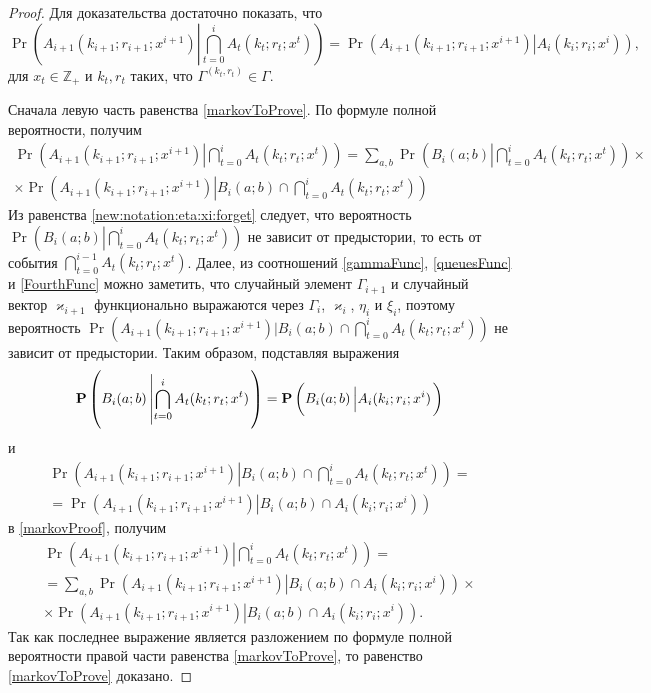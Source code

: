\documentclass[a4paper,12pt,russian]{extarticle}
\begin{document}
\begin{proof}
Для доказательства достаточно показать, что 
\begin{equation}
\Pr \left( A_{i+1}(k_{i+1};r_{i+1};x^{i+1}) \left|\bigcap_{t=0}^{i} A_t(k_t;r_t;x^{t})\right.\right) = \Pr \left( A_{i+1}(k_{i+1};r_{i+1};x^{i+1}) \left|A_i(k_i;r_i;x^{i})\right.\right),
\label{markovToProve}
\end{equation}
для $x_t \in {\mathbb Z}_+$ и $k_t,r_t$ таких, что $\Gamma^{(k_t,r_t)}\in \Gamma$.

Сначала левую часть равенства \eqref{markovToProve}. По формуле полной вероятности, получим
\begin{multline}
\Pr \left( A_{i+1}(k_{i+1};r_{i+1};x^{i+1}) \left|\bigcap_{t=0}^{i} A_t(k_t;r_t;x^{t})\right.\right) 
= \sum_{a,b}\Pr \left( B_i(a;b) \left|\bigcap_{t=0}^{i} A_t(k_t;r_t;x^{t})\right.\right)\times\\
\times \Pr \left( A_{i+1}(k_{i+1};r_{i+1};x^{i+1}) \left|B_i(a;b) \cap \bigcap_{t=0}^{i} A_t(k_t;r_t;x^{t})\right.\right)
\label{markovProof}
\end{multline}
Из равенства \eqref{new:notation:eta:xi:forget} следует, что вероятность  $\Pr \left( B_i(a;b) \left|\bigcap_{t=0}^{i} A_t(k_t;r_t;x^{t})\right.\right)$ не зависит от предыстории, то есть от события $\bigcap_{t=0}^{i-1} A_t(k_t;r_t;x^{t})$. 
Далее, из соотношений \eqref{gammaFunc}, \eqref{queuesFunc} и \eqref{FourthFunc} можно заметить, что случайный элемент $\Gamma_{i+1}$ и случайный вектор $\varkappa_{i+1}$ функционально выражаются через $\Gamma_i$, $\varkappa_i$, $\eta_i$ и $\xi_i$, поэтому вероятность $\Pr ( A_{i+1}(k_{i+1};r_{i+1};x^{i+1}) |B_i(a;b) \cap \bigcap_{t=0}^{i} A_t(k_t;r_t;x^{t}))$ не зависит от предыстории. Таким образом, подставляя выражения
\begin{equation*}
\Pr \left( B_i(a;b) \left|\bigcap_{t=0}^{i} A_t(k_t;r_t;x^{t})\right.\right) = \\
\Pr \left( B_i(a;b) \left| A_i(k_i;r_i;x^{i})\right.\right)
\end{equation*}
и 
\begin{multline*}
\Pr \left( A_{i+1}(k_{i+1};r_{i+1};x^{i+1}) \left|B_i(a;b) \cap \bigcap_{t=0}^{i} A_t(k_t;r_t;x^{t})\right.\right) = \\
=\Pr \left( A_{i+1}(k_{i+1};r_{i+1};x^{i+1}) \left|B_i(a;b) \cap A_i(k_i;r_i;x^{i})\right.\right)
\end{multline*}
в \eqref{markovProof}, получим
\begin{multline*}
\Pr \left( A_{i+1}(k_{i+1};r_{i+1};x^{i+1}) \left|\bigcap_{t=0}^{i} A_t(k_t;r_t;x^{t})\right.\right) =\\
= \sum_{a,b} \Pr \left( A_{i+1}(k_{i+1};r_{i+1};x^{i+1}) \left|B_i(a;b) \cap A_i(k_i;r_i;x^{i})\right.\right) \times\\
\times \Pr \left( A_{i+1}(k_{i+1};r_{i+1};x^{i+1}) \left|B_i(a;b) \cap A_i(k_i;r_i;x^{i})\right.\right).
\end{multline*}
Так как последнее выражение является разложением по формуле полной вероятности правой части равенства \eqref{markovToProve}, то равенство \eqref{markovToProve} доказано.
\end{proof}
\end{document}
